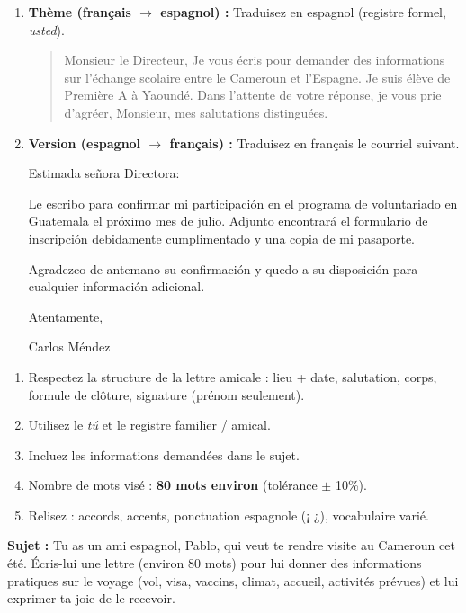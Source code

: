 \documentclass[11pt]{article}
\begin{document}
\begin{exercice}
\begin{enumerate}
\item \textbf{Thème (français $\rightarrow$ espagnol) :} Traduisez en espagnol (registre formel, \emph{usted}).
\begin{quote}
Monsieur le Directeur,
Je vous écris pour demander des informations sur l'échange scolaire entre le Cameroun et l'Espagne. Je suis élève de Première A à Yaoundé. Dans l'attente de votre réponse, je vous prie d'agréer, Monsieur, mes salutations distinguées.
\end{quote}
\item \textbf{Version (espagnol $\rightarrow$ français) :} Traduisez en français le courriel suivant.
\begin{textebox}
Estimada señora Directora:

Le escribo para confirmar mi participación en el programa de voluntariado en Guatemala el próximo mes de julio. Adjunto encontrará el formulario de inscripción debidamente cumplimentado y una copia de mi pasaporte.

Agradezco de antemano su confirmación y quedo a su disposición para cualquier información adicional.

Atentamente,

Carlos Méndez
\end{textebox}
\end{enumerate}
\end{exercice}

\begin{exercice}
\end{exercice}

\begin{methode}
\begin{enumerate}
\item Respectez la structure de la lettre amicale : lieu + date, salutation, corps, formule de clôture, signature (prénom seulement).
\item Utilisez le \emph{tú} et le registre familier / amical.
\item Incluez les informations demandées dans le sujet.
\item Nombre de mots visé : \textbf{80 mots environ} (tolérance $\pm$ 10\%).
\item Relisez : accords, accents, ponctuation espagnole (¡ ¿), vocabulaire varié.
\end{enumerate}
\end{methode}
\textbf{Sujet :} Tu as un ami espagnol, Pablo, qui veut te rendre visite au Cameroun cet été. Écris-lui une lettre (environ 80 mots) pour lui donner des informations pratiques sur le voyage (vol, visa, vaccins, climat, accueil, activités prévues) et lui exprimer ta joie de le recevoir.
\end{document}
